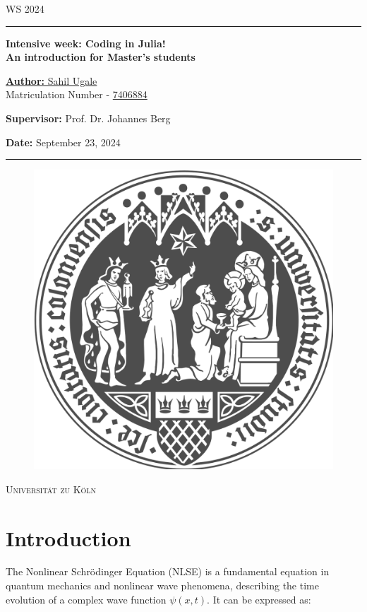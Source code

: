 \documentclass[8pt, a4paper, twocolumn]{article}
\begin{document}
\begin{titlepage}
	WS 2024
	\vspace{1cm}
	\begin{center}
		\rule{\textwidth}{0.4pt}

		\vspace{1cm}
		\textbf{\Huge Intensive week: Coding in Julia!\\[1ex]
		    \Large{An introduction for Master's students}}
		    
		\vspace{1cm}
		{\Large\underline{\textbf{Author:} Sahil Ugale}}\\
		\vspace{0.2cm}
		Matriculation Number - \underline{7406884}
		
		\vspace{1cm}
		{\large{
		\textbf{Supervisor:} Prof. Dr. Johannes Berg
		
		\vspace{1cm}
		
		\textbf{Date:} September 23, 2024}}
        \vspace{1cm}
		\rule{\textwidth}{0.4pt}
        \begin{figure}[hb]
		    \centering
		    \includegraphics[width=0.4\linewidth]{images/uni_koeln.png}
		\end{figure}
		\Huge{\textsc{Universität zu Köln}}

	\end{center}
\end{titlepage}

\tableofcontents
\hrulefill

\section{Introduction}

The Nonlinear Schrödinger Equation (NLSE) is a fundamental equation in quantum mechanics and nonlinear wave 
phenomena, describing the time evolution of a complex wave function $\psi(x,t)$. It can be expressed as:
\end{document}
